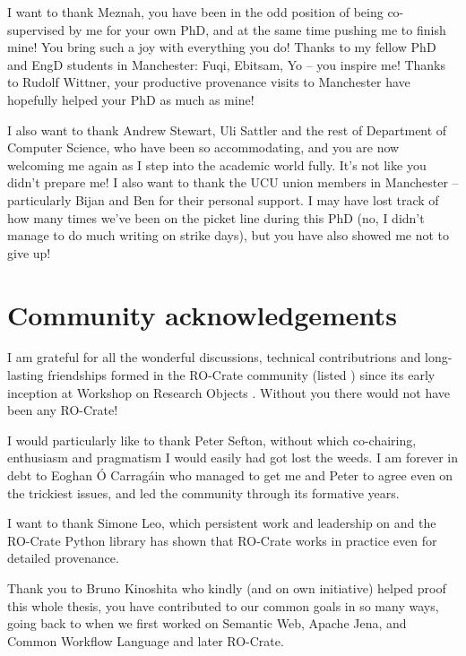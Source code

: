 I want to thank Meznah, you have been in the odd position of being co-supervised by me for your own PhD, and at the same time pushing me to finish mine! You bring such a joy with everything you do!  Thanks to my fellow PhD and EngD students in Manchester: Fuqi, Ebitsam, Yo  -- you inspire me! Thanks to Rudolf Wittner, your productive provenance visits to Manchester have hopefully helped your PhD as much as mine!  

I also want to thank Andrew Stewart, Uli Sattler and the rest of Department of Computer Science, who have been so accommodating, and you are now welcoming me again as I step into the academic world fully. It's not like you didn't prepare me!
I also want to thank the UCU union members in Manchester  -- particularly Bijan and Ben for their personal support. I may have lost track of how many times we've been on the picket line during this PhD (no, I didn't manage to do much writing on strike days), but you have also showed me not to give up!


\section{Community acknowledgements}\label{community-acknowledgements}

I am grateful for all the wonderful discussions, technical contributrions and long-lasting friendships formed in the RO-Crate community (listed ) since its early inception \cite{OCarragain 2019} at Workshop on Research Objects . Without you there would not have been any RO-Crate!

I would particularly like to thank Peter Sefton, without which co-chairing, enthusiasm and pragmatism I would easily had got lost the weeds.  I am forever in debt to Eoghan Ó Carragáin who managed to get me and Peter to agree even on the trickiest issues, and led the community through its formative years.

I want to thank Simone Leo, which persistent work and leadership on  and the RO-Crate Python library \cite{ro-crate-py} has shown that RO-Crate works in practice even for detailed provenance. 

Thank you to Bruno Kinoshita who kindly (and on own initiative) helped proof this whole thesis, you have contributed to our common goals in so many ways, going back to when we first worked on Semantic Web, Apache Jena, and Common Workflow Language and later RO-Crate.

